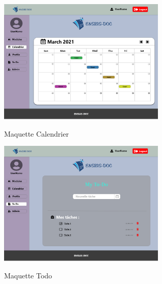 \documentclass{article}
\begin{document}
{ \begin{minipage}[c]{.46\linewidth}
     \begin{center}
      \vspace{1cm}
             \includegraphics[width=8cm]{Calendrier.png}
             \caption{Maquette Calendrier}
             \label{fig:Maquette Calendrier}
         \end{center}
   \end{minipage} \hfill
   \begin{minipage}[c]{.46\linewidth}
    \begin{center}
    \vspace{1cm}
            \includegraphics[width=8cm]{ToDo (1).png}
            \caption{Maquette Todo}
            \label{Maquette Todo}
        \end{center}
 \end{minipage}
 
}
\end{document}
